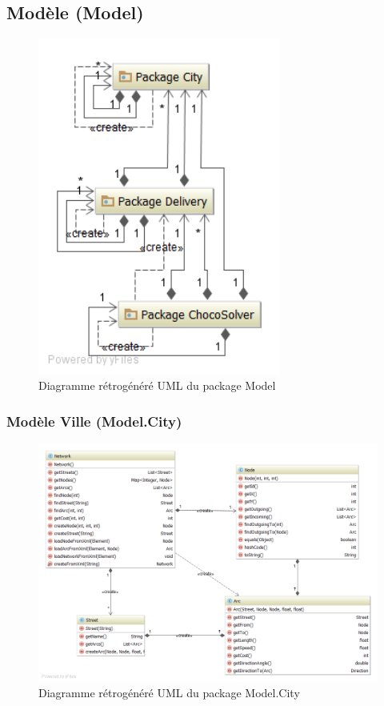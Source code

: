 \subsection{Mod\`ele (Model)}

\begin{figure}[h]
    \centering
    \includegraphics[width=80mm]{../diagrams/classes_packages/final_classes_packages/model/package_model.png}
    \caption{Diagramme r\'etrog\'en\'er\'e UML du package Model}
    \label{diagram:gen_uml_model}
\end{figure}
\pagebreak

\subsubsection{Mod\`ele Ville (Model.City)}

\begin{figure}[h]
    \centering
    \includegraphics[width=160mm]{../diagrams/classes_packages/final_classes_packages/model/city.png}
    \caption{Diagramme r\'etrog\'en\'er\'e UML du package Model.City}
    \label{diagram:gen_uml_model_city}
\end{figure}
\pagebreak

